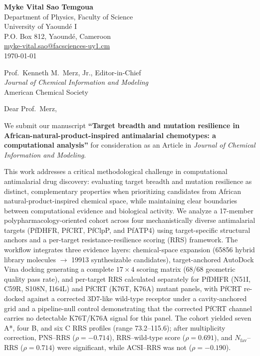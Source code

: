 \documentclass[9pt,letterpaper]{article}
\begin{document}
\fontsize{9}{10.5}\selectfont

\begin{flushleft}
\textbf{Myke Vital Sao Temgoua} \\
Department of Physics, Faculty of Science \\
University of Yaound\'{e} I \\
P.O. Box 812, Yaound\'{e}, Cameroon \\
\href{mailto:myke-vital.sao@facsciences-uy1.cm}{myke-vital.sao@facsciences-uy1.cm} \\[0.8em]
\today
\end{flushleft}

\begin{flushleft}
Prof.\ Kenneth M.\ Merz, Jr., Editor-in-Chief \\
\textit{Journal of Chemical Information and Modeling} \\
American Chemical Society
\end{flushleft}

\vspace{0.2em}

\noindent Dear Prof.\ Merz,

We submit our manuscript \textbf{``Target breadth and mutation resilience in African-natural-product-inspired antimalarial chemotypes: a computational analysis''} for consideration as an Article in \textit{Journal of Chemical Information and Modeling}.

This work addresses a critical methodological challenge in computational antimalarial drug discovery: evaluating target breadth and mutation resilience as distinct, complementary properties when prioritizing candidates from African natural-product-inspired chemical space, while maintaining clear boundaries between computational evidence and biological activity. We analyze a 17-member polypharmacology-oriented cohort across four mechanistically diverse antimalarial targets (PfDHFR, PfCRT, PfClpP, and PfATP4) using target-specific structural anchors and a per-target resistance-resilience scoring (RRS) framework. The workflow integrates three evidence layers: chemical-space expansion (\num{65856} hybrid library molecules $\rightarrow$ \num{19913} synthesizable candidates), target-anchored AutoDock Vina docking generating a complete $\num{17}\times\num{4}$ scoring matrix (\num{68}/\num{68} geometric quality pass rate), and per-target RRS calculated separately for PfDHFR (N51I, C59R, S108N, I164L) and PfCRT (K76T, K76A) mutant panels, with PfCRT re-docked against a corrected 3D7-like wild-type receptor under a cavity-anchored grid and a pipeline-null control demonstrating that the corrected PfCRT channel carries no detectable K76T/K76A signal for this panel. The cohort yielded seven A*, four B, and six C RRS profiles (range \numrange{73.2}{115.6}); after multiplicity correction, PNS--RRS ($\rho=-\num{0.714}$), RRS--wild-type score ($\rho=\num{+0.691}$), and $N_{\mathrm{fav}}$--RRS ($\rho=\num{0.714}$) were significant, while ACSI--RRS was not ($\rho=-\num{0.190}$).
\end{document}
